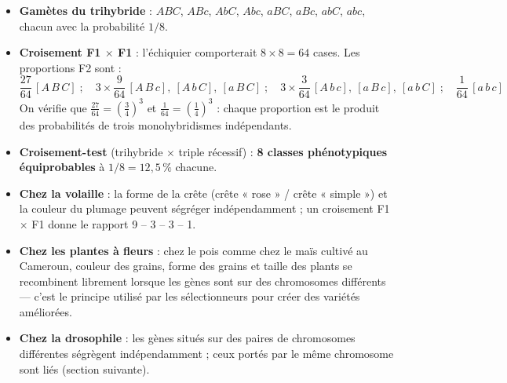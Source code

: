 \documentclass[11pt]{article}
\begin{document}
\begin{itemize}
\item \textbf{Gamètes du trihybride} : $ABC$, $ABc$, $AbC$, $Abc$, $aBC$, $aBc$, $abC$, $abc$, chacun avec la probabilité $1/8$.
\item \textbf{Croisement F1 $\times$ F1} : l'échiquier comporterait $8 \times 8 = 64$ cases. Les proportions F2 sont :
\[ \frac{27}{64}\,[A\,B\,C] \;;\quad 3 \times \frac{9}{64}\,[A\,B\,c],\ [A\,b\,C],\ [a\,B\,C] \;;\quad 3 \times \frac{3}{64}\,[A\,b\,c],\ [a\,B\,c],\ [a\,b\,C] \;;\quad \frac{1}{64}\,[a\,b\,c] \]
On vérifie que $\frac{27}{64} = \left(\frac{3}{4}\right)^{3}$ et $\frac{1}{64} = \left(\frac{1}{4}\right)^{3}$ : chaque proportion est le produit des probabilités de trois monohybridismes indépendants.
\item \textbf{Croisement-test} (trihybride $\times$ triple récessif) : \textbf{8 classes phénotypiques équiprobables} à $1/8 = 12{,}5\,\%$ chacune.
\end{itemize}

\begin{exemplebox}
\begin{itemize}
\item \textbf{Chez la volaille} : la forme de la crête (crête « rose » / crête « simple ») et la couleur du plumage peuvent ségréger indépendamment ; un croisement F1 $\times$ F1 donne le rapport 9 -- 3 -- 3 -- 1.
\item \textbf{Chez les plantes à fleurs} : chez le pois comme chez le maïs cultivé au Cameroun, couleur des grains, forme des grains et taille des plants se recombinent librement lorsque les gènes sont sur des chromosomes différents — c'est le principe utilisé par les sélectionneurs pour créer des variétés améliorées.
\item \textbf{Chez la drosophile} : les gènes situés sur des paires de chromosomes différentes ségrègent indépendamment ; ceux portés par le même chromosome sont liés (section suivante).
\end{itemize}
\end{exemplebox}
\end{document}
